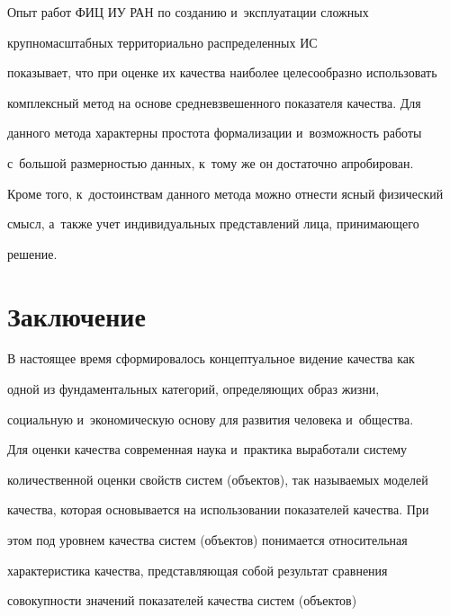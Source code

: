      

     Опыт работ ФИЦ ИУ РАН по созданию и~эксплуатации сложных 

крупномасштабных территориально распределенных ИС

показывает, что при оценке их качества наиболее целесообразно использовать 

комплексный метод на основе средневзвешенного показателя качества. Для 

данного метода характерны простота формализации и~возможность работы 

с~большой раз\-мер\-ностью данных, к~тому же он достаточно апробирован. 

Кроме того, к~достоинствам данного метода можно отнести ясный физический 

смысл, а~также учет индивидуальных пред\-став\-ле\-ний лица, при\-ни\-ма\-юще\-го 

решение.



\vspace*{-4pt}



\section{Заключение}



\vspace*{-4pt}

     

     В настоящее время сформировалось концептуальное видение качества как 

одной из фундаментальных категорий, определяющих образ жизни, 

социальную и~экономическую основу для развития человека и~общества.

     

     Для оценки качества современная наука и~практика выработали систему 

количественной оценки свойств сис\-тем (объектов), так на\-зы\-ва\-емых моделей 

качества, которая основывается на использовании показателей качества. При 

этом под уровнем качества систем (объектов) понимается относительная 

характеристика качества, представляющая собой результат сравнения 

со\-во\-куп\-ности значений показателей качества сис\-тем (объектов) 

